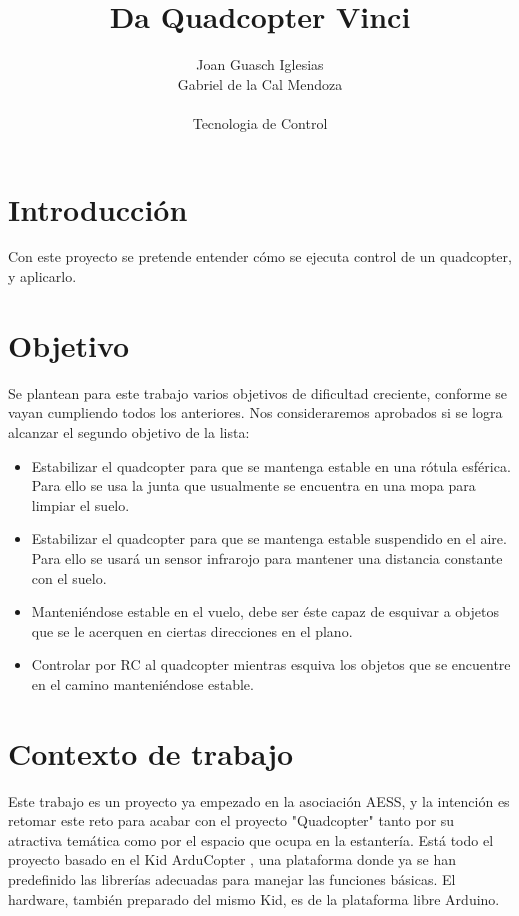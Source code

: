 \documentclass{article}
\title{Da Quadcopter Vinci}
\author{Joan Guasch Iglesias\\Gabriel de la Cal Mendoza\\\\
  \small Tecnologia de Control\\
}
\begin{document}
\maketitle


\newpage


\section{Introducción}
Con este proyecto se pretende entender cómo se ejecuta control de un quadcopter, y aplicarlo. 

\section{Objetivo}
Se plantean para este trabajo varios objetivos de dificultad creciente, conforme se vayan cumpliendo todos los anteriores. Nos consideraremos aprobados si se logra alcanzar el segundo objetivo de la lista:
\begin{itemize}
	\item Estabilizar el quadcopter para que se mantenga estable en una rótula esférica. Para ello se usa la junta que usualmente se encuentra en una mopa para limpiar el suelo.
	\item Estabilizar el quadcopter para que se mantenga estable suspendido en el aire. Para ello se usará un sensor infrarojo para mantener una distancia constante con el suelo.
	\item Manteniéndose estable en el vuelo, debe ser éste capaz de esquivar a objetos que se le acerquen en ciertas direcciones en el plano.
	\item Controlar por RC al quadcopter mientras esquiva los objetos que se encuentre en el camino manteniéndose estable.
\end{itemize}

\section{Contexto de trabajo} 
Este trabajo es un proyecto ya empezado en la asociación AESS, y la intención es retomar este reto para acabar con el proyecto "Quadcopter" tanto por su atractiva temática como por el espacio que ocupa en la estantería.
Está todo el proyecto basado en el Kid ArduCopter \cite{1}, una plataforma donde ya se han predefinido las librerías adecuadas para manejar las funciones básicas. El hardware, también preparado del mismo Kid, es de la plataforma libre Arduino.
\end{document}

